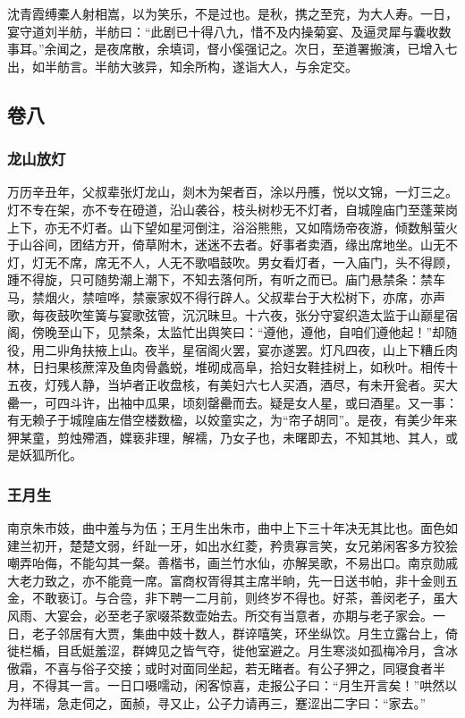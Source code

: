 \documentclass[]{article}
\begin{document}
沈青霞缚橐人射相嵩，以为笑乐，不是过也。是秋，携之至兖，为大人寿。一日，宴守道刘半舫，半舫曰：``此剧已十得八九，惜不及内操菊宴、及逼灵犀与囊收数事耳。''余闻之，是夜席散，余填词，督小傒强记之。次日，至道署搬演，已增入七出，如半舫言。半舫大骇异，知余所构，遂诣大人，与余定交。

\hypertarget{header-n599}{%
\subsection{卷八}\label{header-n599}}

\hypertarget{header-n601}{%
\subsubsection{龙山放灯}\label{header-n601}}

万历辛丑年，父叔辈张灯龙山，剡木为架者百，涂以丹雘，悦以文锦，一灯三之。灯不专在架，亦不专在磴道，沿山袭谷，枝头树杪无不灯者，自城隍庙门至蓬莱岗上下，亦无不灯者。山下望如星河倒注，浴浴熊熊，又如隋炀帝夜游，倾数斛萤火于山谷间，团结方开，倚草附木，迷迷不去者。好事者卖酒，缘出席地坐。山无不灯，灯无不席，席无不人，人无不歌唱鼓吹。男女看灯者，一入庙门，头不得顾，踵不得旋，只可随势潮上潮下，不知去落何所，有听之而已。庙门悬禁条：禁车马，禁烟火，禁喧哗，禁豪家奴不得行辟人。父叔辈台于大松树下，亦席，亦声歌，每夜鼓吹笙簧与宴歌弦管，沉沉昧旦。十六夜，张分守宴织造太监于山巅星宿阁，傍晚至山下，见禁条，太监忙出舆笑曰：``遵他，遵他，自咱们遵他起！''却随役，用二丱角扶掖上山。夜半，星宿阁火罢，宴亦遂罢。灯凡四夜，山上下糟丘肉林，日扫果核蔗滓及鱼肉骨蠡蜕，堆砌成高阜，拾妇女鞋挂树上，如秋叶。相传十五夜，灯残人静，当垆者正收盘核，有美妇六七人买酒，酒尽，有未开瓮者。买大罍一，可四斗许，出袖中瓜果，顷刻罄罍而去。疑是女人星，或曰酒星。又一事：有无赖子于城隍庙左借空楼数楹，以姣童实之，为``帘子胡同''。是夜，有美少年来狎某童，剪烛殢酒，媟亵非理，解襦，乃女子也，未曙即去，不知其地、其人，或是妖狐所化。

\hypertarget{header-n606}{%
\subsubsection{王月生}\label{header-n606}}

南京朱市妓，曲中羞与为伍；王月生出朱市，曲中上下三十年决无其比也。面色如建兰初开，楚楚文弱，纤趾一牙，如出水红菱，矜贵寡言笑，女兄弟闲客多方狡狯嘲弄咍侮，不能勾其一粲。善楷书，画兰竹水仙，亦解吴歌，不易出口。南京勋戚大老力致之，亦不能竟一席。富商权胥得其主席半晌，先一日送书帕，非十金则五金，不敢亵订。与合卺，非下聘一二月前，则终岁不得也。好茶，善闵老子，虽大风雨、大宴会，必至老子家啜茶数壶始去。所交有当意者，亦期与老子家会。一日，老子邻居有大贾，集曲中妓十数人，群谇嘻笑，环坐纵饮。月生立露台上，倚徙栏楯，目氐娗羞涩，群婢见之皆气夺，徙他室避之。月生寒淡如孤梅冷月，含冰傲霜，不喜与俗子交接；或时对面同坐起，若无睹者。有公子狎之，同寝食者半月，不得其一言。一日口嗫嚅动，闲客惊喜，走报公子曰：``月生开言矣！''哄然以为祥瑞，急走伺之，面赪，寻又止，公子力请再三，蹇涩出二字曰：``家去。''
\end{document}
